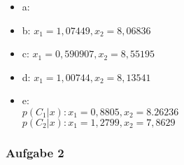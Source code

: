 \documentclass{article}
\begin{document}
\begin{itemize}
	\item a:
	\item b: $x_1 = 1,07449 , x_2 = 8,06836$
	\item c: $x_1 = 0,590907 , x_2 = 8,55195$
	\item d: $x_1 = 1,00744 , x_2 = 8,13541$
	\item e: \\$p(C_1 | x) : x_1 = 0,8805 , x_2 = 8.26236$ \\ 		$p(C_2| x) : x_1 = 1,2799 , x_2 = 7,8629$
\end{itemize}

\subsubsection{Aufgabe 2}
\end{document}
